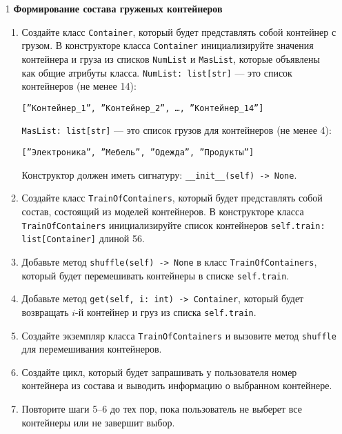 \begin{enumerate}
\item[1] \textbf{Формирование состава груженых контейнеров}
\begin{enumerate}
    \item Создайте класс \texttt{Container}, который будет представлять собой контейнер с грузом. В конструкторе класса \texttt{Container} инициализируйте значения контейнера и груза из списков \texttt{NumList} и \texttt{MasList}, которые объявлены как общие атрибуты класса. \texttt{NumList: list[str]} — это список контейнеров (не менее 14): 
    \begin{center}
        \texttt{[''Контейнер\_1'', ''Контейнер\_2'', \dots, ''Контейнер\_14'']}
    \end{center}
    \texttt{MasList: list[str]} — это список грузов для контейнеров (не менее 4):
    \begin{center}
        \texttt{[''Электроника'', ''Мебель'', ''Одежда'', ''Продукты'']}
    \end{center}
    Конструктор должен иметь сигнатуру: \texttt{\_\_init\_\_(self) -> None}.

    \item Создайте класс \texttt{TrainOfContainers}, который будет представлять собой состав, состоящий из моделей контейнеров. В конструкторе класса \texttt{TrainOfContainers} инициализируйте список контейнеров \texttt{self.train: list[Container]} длиной 56.

    \item Добавьте метод \texttt{shuffle(self) -> None} в класс \texttt{TrainOfContainers}, который будет перемешивать контейнеры в списке \texttt{self.train}.

    \item Добавьте метод \texttt{get(self, i: int) -> Container}, который будет возвращать $i$-й контейнер и груз из списка \texttt{self.train}.

    \item Создайте экземпляр класса \texttt{TrainOfContainers} и вызовите метод \texttt{shuffle} для перемешивания контейнеров.

    \item Создайте цикл, который будет запрашивать у пользователя номер контейнера из состава и выводить информацию о выбранном контейнере.

    \item Повторите шаги 5–6 до тех пор, пока пользователь не выберет все контейнеры или не завершит выбор.


\end{enumerate}
\end{enumerate}

